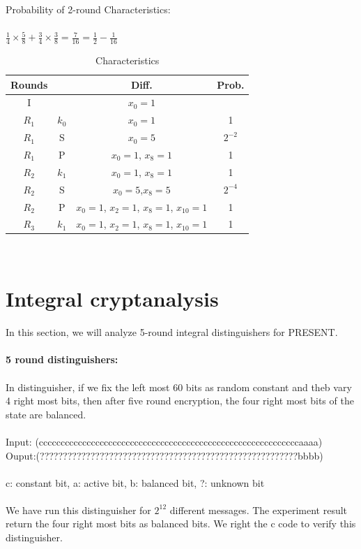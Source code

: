 \documentclass[journal=tosc,preprint]{iacrtrans}
\begin{document}
	Probability of 2-round Characteristics:\\\\
	$\frac{1}{4} \times \frac{5}{8}+\frac{3}{4} \times \frac{3}{8}=\frac{7}{16}=\frac{1}{2}-\frac{1}{16}$\\
\begin{table}[h!]
	\caption{Characteristics}
	\centering
	\begin{tabular}{ |c||c|c|c| }
		\hline
		Rounds & & Diff. & Prob. \\ \hline \hline
		I& & $x_0 = 1$ &  \\ 
		$R_1$& $k_0$ & $x_0 = 1$ & 1 \\
		$R_1$& S & $x_0 = 5$ & $2^{-2}$ \\
		$R_1$& P & $x_0 = 1$, $x_{8} = 1$ & 1 \\
		$R_2$& $k_1$ & $x_0 = 1$, $x_{8} = 1$ & 1 \\
		$R_2$& S & $x_0 = 5$,$x_8 = 5$ & $2^{-4}$ \\
		$R_2$& P & $x_0 = 1$, $x_2 = 1$, $x_8 = 1$, $x_{10} = 1$ & 1 \\
		$R_3$& $k_1$ & $x_0 = 1$, $x_2 = 1$, $x_8 = 1$, $x_{10} = 1$ & 1 \\
		 \hline
	\end{tabular}\\
\end{table}
\section{Integral cryptanalysis}
In this section, we will analyze 5-round integral distinguishers for PRESENT.\\\\
\textbf{5 round distinguishers:}\\\\
In distinguisher, if we fix the left most 60 bits as random constant and theb vary 4 right most bits, then after five round encryption, the four right most bits of the state are balanced.\\\\
Input: (ccccccccccccccccccccccccccccccccccccccccccccccccccccccccccccaaaa)\\
Ouput:(????????????????????????????????????????????????????????bbbb)\\\\
c: constant bit, a: active bit, b: balanced bit, ?: unknown bit\\\\
We have run this distinguisher for $2^{12}$ different messages. The experiment result return the four right most bits as balanced bits. We right the c code to verify this distinguisher.
\end{document}
